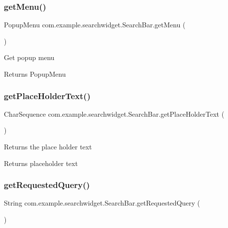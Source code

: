 \subsubsection{\texorpdfstring{getMenu()}{getMenu()}}
{\footnotesize\ttfamily Popup\+Menu com.\+example.\+searchwidget.\+Search\+Bar.\+get\+Menu (\begin{DoxyParamCaption}{ }\end{DoxyParamCaption})}

Get popup menu

\begin{DoxyReturn}{Returns}
Popup\+Menu 
\end{DoxyReturn}
\mbox{\label{classcom_1_1example_1_1searchwidget_1_1_search_bar_a97ca29bf8c1fe951bec0dee054187108}} 
\subsubsection{\texorpdfstring{getPlaceHolderText()}{getPlaceHolderText()}}
{\footnotesize\ttfamily Char\+Sequence com.\+example.\+searchwidget.\+Search\+Bar.\+get\+Place\+Holder\+Text (\begin{DoxyParamCaption}{ }\end{DoxyParamCaption})}

Returns the place holder text

\begin{DoxyReturn}{Returns}
placeholder text 
\end{DoxyReturn}
\mbox{\label{classcom_1_1example_1_1searchwidget_1_1_search_bar_a4e9189e7948cfa925689c3aea179b3a5}} 
\subsubsection{\texorpdfstring{getRequestedQuery()}{getRequestedQuery()}}
{\footnotesize\ttfamily String com.\+example.\+searchwidget.\+Search\+Bar.\+get\+Requested\+Query (\begin{DoxyParamCaption}{ }\end{DoxyParamCaption})}

